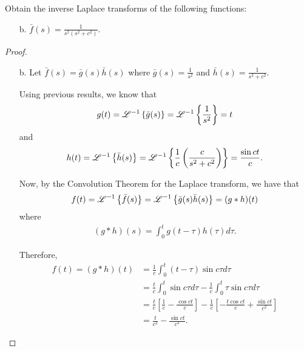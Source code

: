 \begin{problem}{3.7}
  Obtain the inverse Laplace transforms of the following functions:
  \begin{enumerate}
    \item[b.] $\displaystyle \bar{f}(s) = \frac{1}{s^2(s^2+c^2)}$.
  \end{enumerate}
\end{problem}

\begin{proof}
  \begin{enumerate}
    \item[b.] Let $\bar{f}(s) = \bar{g}(s)\bar{h}(s)$ where $\displaystyle \bar{g}(s) = \frac{1}{s^2}$
      and $\bar{h}(s) = \frac{1}{s^2+c^2}$.

      Using previous results, we know that
      \begin{align*}
        g(t) = \mathscr{L}^{-1}\left\{ {\bar{g}(s)} \right\} = \mathscr{L}^{-1}\left\{ {\frac{1}{s^2}} \right\} = t
      \end{align*}
      and
      \begin{align*}
        h(t) = \mathscr{L}^{-1}\left\{ {\bar{h}(s)} \right\} = \mathscr{L}^{-1}\left\{ {\frac{1}{c}\left(\frac{c}{s^2+c^2}\right)} \right\} = \frac{\sin ct}{c}.
      \end{align*}

      Now, by the Convolution Theorem for the Laplace transform, we have that
      \begin{align*}
        f(t) = \mathscr{L}^{-1}\left\{ {\bar{f}(s)} \right\} = \mathscr{L}^{-1}\left\{ {\bar{g}(s)\bar{h}(s)} \right\} = (g\ast h)(t)
      \end{align*}
      where
      \begin{align*}
        (g \ast h) (s) = \int_0^t g(t - \tau)h(\tau) d\tau.
      \end{align*}

      Therefore,
      \begin{align*}
        f(t) = (g \ast h)(t)
        &= \frac{1}{c}\int_0^t (t-\tau) \sin c \tau d\tau \\
        &= \frac{t}{c}\int_0^t \sin c\tau d\tau - \frac{1}{c} \int_0^t \tau \sin c\tau d\tau \\
        &= \frac{t}{c}\left[\frac{1}{c} - \frac{\cos ct}{c}\right] - \frac{1}{c}\left[-\frac{t\cos ct}{c} + \frac{\sin ct }{c^2}\right] \\
        &= \frac{t}{c^2} - \frac{\sin ct}{c^3}.
      \end{align*}
  \end{enumerate}
\end{proof}
\newpage
